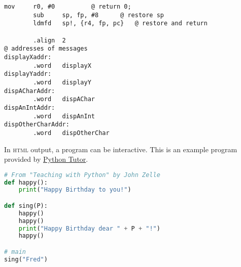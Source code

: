 \documentclass[10pt,]{article}
\newcommand{\initialism}[1]{\textsc{\MakeLowercase{#1}}}
\theoremstyle{plain}
\theoremstyle{definition}
\theoremstyle{definition}
\theoremstyle{definition}
\theoremstyle{definition}
\theoremstyle{definition}
\theoremstyle{definition}
\numberwithin{equation}{section}
\newenvironment{listing}{\par\bigskip\noindent}{}
\begin{document}
\begin{listing}
\begin{lstlisting}[style=genericinput]
        mov     r0, #0          @ return 0;
        sub     sp, fp, #8      @ restore sp
        ldmfd   sp!, {r4, fp, pc}   @ restore and return

        .align  2
@ addresses of messages
displayXaddr:
        .word   displayX
displayYaddr:
        .word   displayY
dispACharAddr:
        .word   dispAChar
dispAnIntAddr:
        .word   dispAnInt
dispOtherCharAddr:
        .word   dispOtherChar
\end{lstlisting}
\par
{}

\end{listing}
\hypertarget{p-641}{}%
In \initialism{HTML} output, a program can be interactive.  This is an example program provided by \href{http://www.pythontutor.com/}{Python Tutor}.%
\begin{listing}
\begin{lstlisting}[style=genericinput, language=Python]
# From "Teaching with Python" by John Zelle
def happy():
    print("Happy Birthday to you!")

def sing(P):
    happy()
    happy()
    print("Happy Birthday dear " + P + "!")
    happy()

# main
sing("Fred")
\end{lstlisting}
\par
{}

\end{listing}
\typeout{************************************************}
\typeout{************************************************}
\end{document}
